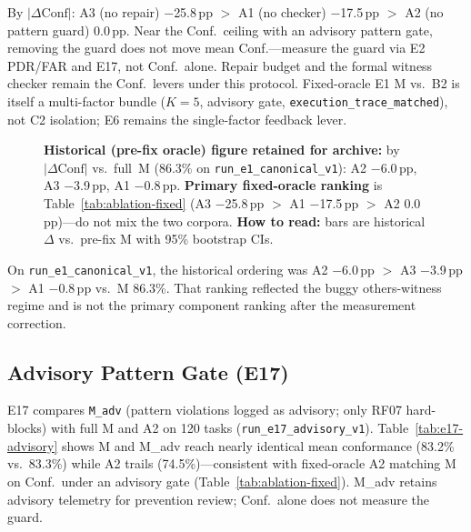 By $|\Delta\mathrm{Conf}|$: A3 (no repair) $-$25.8\,pp $>$ A1 (no checker)
$-$17.5\,pp $>$ A2 (no pattern guard) $0.0$\,pp.
Near the Conf.\ ceiling with an advisory pattern gate, removing the guard does
not move mean Conf.---measure the guard via E2 PDR/FAR and E17, not Conf.\
alone.
Repair budget and the formal witness checker remain the Conf.\ levers under
this protocol.
Fixed-oracle E1 M vs.\ B2 is itself a multi-factor bundle ($K{=}5$, advisory
gate, \texttt{execution\_trace\_matched}), not C2 isolation; E6 remains the
single-factor feedback lever.

\begin{figure}[t]
  \centering
  \caption{\textbf{Historical (pre-fix oracle) figure retained for archive:}
    by $|\Delta\mathrm{Conf}|$ vs.\ full~M (86.3\% on
    \texttt{run\_e1\_canonical\_v1}): A2 $-$6.0\,pp, A3 $-$3.9\,pp, A1
    $-$0.8\,pp.
    \textbf{Primary fixed-oracle ranking} is Table~\ref{tab:ablation-fixed}
    (A3 $-$25.8\,pp $>$ A1 $-$17.5\,pp $>$ A2 $0.0$\,pp)---do not mix the two
    corpora.
    \textbf{How to read:} bars are historical $\Delta$ vs.\ pre-fix M with
    95\% bootstrap CIs.}
  \label{fig:ablation}
\end{figure}

On \texttt{run\_e1\_canonical\_v1}, the historical ordering was A2 $-$6.0\,pp
$>$ A3 $-$3.9\,pp $>$ A1 $-$0.8\,pp vs.\ M 86.3\%.
That ranking reflected the buggy others-witness regime and is not the primary
component ranking after the measurement correction.

\subsection{Advisory Pattern Gate (E17)}
\label{sec:results:e17}

E17 compares \texttt{M\_adv} (pattern violations logged as advisory; only RF07
hard-blocks) with full M and A2 on 120 tasks (\texttt{run\_e17\_advisory\_v1}).
Table~\ref{tab:e17-advisory} shows M and M\_adv reach nearly identical mean
conformance (83.2\% vs.\ 83.3\%) while A2 trails (74.5\%)---consistent with
fixed-oracle A2 matching M on Conf.\ under an advisory gate
(Table~\ref{tab:ablation-fixed}).
M\_adv retains advisory telemetry for prevention review; Conf.\ alone does not
measure the guard.

\begin{table}[H]
  \caption{E17 advisory pattern guard vs.\ A2 and M ($n{=}120$).}
  \label{tab:e17-advisory}
  \centering
\end{table}

